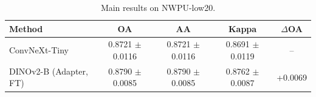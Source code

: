 \begin{table}[t]
  \centering
  \caption{Main results on NWPU-low20.}
  \label{tab:nwpu-low20_main}
  \begin{tabular}{l c c c c}
    \toprule
    Method & OA & AA & Kappa & $\Delta$OA \\
    \midrule
    ConvNeXt-Tiny & 0.8721 $\pm$ 0.0116 & 0.8721 $\pm$ 0.0116 & 0.8691 $\pm$ 0.0119 & -- \\
    DINOv2-B (Adapter, FT) & 0.8790 $\pm$ 0.0085 & 0.8790 $\pm$ 0.0085 & 0.8762 $\pm$ 0.0087 & +0.0069 \\
    \bottomrule
  \end{tabular}
\end{table}

